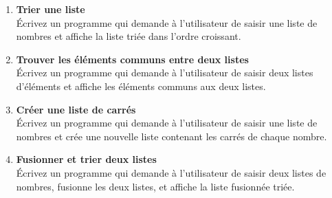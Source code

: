 \begin{enumerate}
    \item \textbf{Trier une liste} \\
    Écrivez un programme qui demande à l'utilisateur de saisir une liste de nombres et affiche la liste triée dans l'ordre croissant.

    \item \textbf{Trouver les éléments communs entre deux listes} \\
    Écrivez un programme qui demande à l'utilisateur de saisir deux listes d'éléments et affiche les éléments communs aux deux listes.

    \item \textbf{Créer une liste de carrés} \\
    Écrivez un programme qui demande à l'utilisateur de saisir une liste de nombres et crée une nouvelle liste contenant les carrés de chaque nombre.

    \item \textbf{Fusionner et trier deux listes} \\
    Écrivez un programme qui demande à l'utilisateur de saisir deux listes de nombres, fusionne les deux listes, et affiche la liste fusionnée triée.

\end{enumerate}
